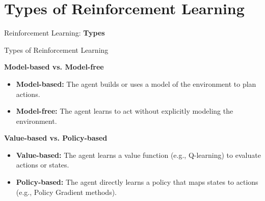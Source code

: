 \section{Types of Reinforcement Learning}
\begin{frame}{}
    \LARGE Reinforcement Learning: \textbf{Types}
\end{frame}

\begin{frame}[allowframebreaks]{Types of Reinforcement Learning}
    \begin{figure}
        \centering
    \end{figure}
\framebreak
    \textbf{Model-based vs. Model-free}
    \begin{itemize}
        \item \textbf{Model-based:} The agent builds or uses a model of the environment to plan actions.
        \item \textbf{Model-free:} The agent learns to act without explicitly modeling the environment.
    \end{itemize}
    \vspace{1em}
    \textbf{Value-based vs. Policy-based}
    \begin{itemize}
        \item \textbf{Value-based:} The agent learns a value function (e.g., Q-learning) to evaluate actions or states.
        \item \textbf{Policy-based:} The agent directly learns a policy that maps states to actions (e.g., Policy Gradient methods).
    \end{itemize}
\framebreak
    \begin{figure}
        \centering
    \end{figure}
\framebreak
    \begin{figure}
        \centering
    \end{figure}
\end{frame}